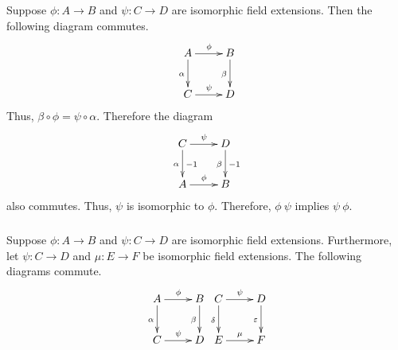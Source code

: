 Suppose $\phi:A\to B$ and $\psi:C\to D$ are isomorphic
field extensions. Then the following diagram commutes.
\begin{displaymath}
\xymatrix{
A \ar[r]^\phi \ar[d]_\alpha & B \ar[d]_\beta \\
C \ar[r]^\psi & D}
\end{displaymath}
Thus, $\beta\circ\phi=\psi\circ\alpha$. Therefore the diagram
\begin{displaymath}
\xymatrix{
C \ar[r]^\psi \ar[d]_\alpha^{-1} & D \ar[d]_\beta^{-1} \\
A \ar[r]^\phi & B}
\end{displaymath}
also commutes. Thus, $\psi$ is isomorphic to $\phi$.
Therefore, $\phi~\psi$ implies $\psi~\phi$.
\subparagraph*{}
Suppose $\phi:A\to B$ and $\psi:C\to D$ are isomorphic field
extensions. Furthermore, let $\psi:C\to D$ and $\mu:E\to F$
be isomorphic field extensions. The following diagrams commute.
\begin{displaymath}
  \xymatrix{
    A \ar[r]^\phi \ar[d]_\alpha & B \ar[d]_\beta \\
    C \ar[r]^\psi & D}
  \xymatrix{
    C \ar[r]^\psi \ar[d]_\delta & D \ar[d]_\varepsilon \\
    E \ar[r]^\mu & F}
\end{displaymath}


